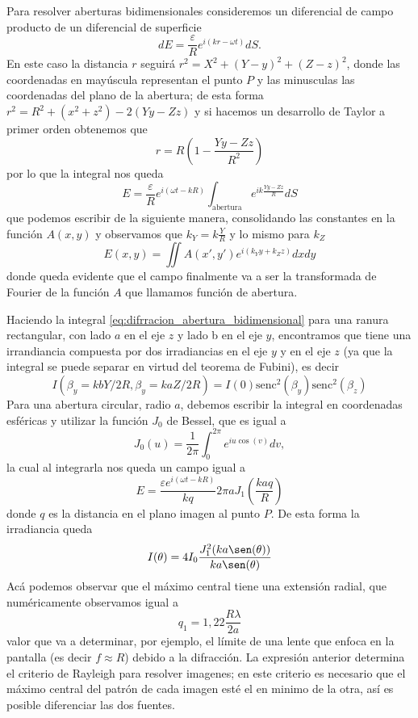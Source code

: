 \documentclass[a4paper]{article}
\numberwithin{equation}{section}
\begin{document}
	Para resolver aberturas bidimensionales consideremos un diferencial de campo producto de un diferencial de superficie \[ dE = \frac{\varepsilon}{R} e^{i (k r - \omega t)} dS.\] En este caso la distancia $r$ seguirá $r^2 = X^2 + (Y - y)^2 + (Z - z)^2$, donde las coordenadas en mayúscula representan el punto $P$ y las minusculas las coordenadas del plano de la abertura; de esta forma $r^2 = R^2 + (x^2 +z^2) - 2(Yy - Zz)$ y si hacemos un desarrollo de Taylor a primer orden obtenemos que \[r = R \left(1 - \frac{Yy - Zz}{R^2}\right)\] por lo que la integral nos queda
	\begin{equation}
		E = \frac{\varepsilon}{R} e^{i(\omega t - k R)} \int_{\text{abertura}} e^{i k \frac{Yy - Zz}{R}} dS
		\label{eq:difraccion_abertura_bidimensional}
	\end{equation}
	que podemos escribir de la siguiente manera, consolidando las constantes en la función $A(x,y)$ y observamos que $k_Y = k \frac{Y}{R}$ y lo mismo para $k_Z$
	\begin{equation}
		E(x,y) = \iint A(x',y') e^{i (k_Y y + k_Z z)} dx dy
		\label{eq:difraccion_general}
	\end{equation}
	donde queda evidente que el campo finalmente va a ser la transformada de Fourier de la función $A$ que llamamos función de abertura.
	
	Haciendo la integral \ref{eq:difrracion_abertura_bidimensional} para una ranura rectangular, con lado $a$ en el eje $z$ y lado b en el eje $y$, encontramos que tiene una irrandiancia compuesta por dos irradiancias en el eje $y$ y en el eje $z$ (ya que la integral se puede separar en virtud del teorema de Fubini), es decir
	\begin{equation}
		I(\beta_y = k b Y / 2 R, \beta_y = k a Z / 2 R) = I(0) \text{senc}^2(\beta_y) \text{senc}^2(\beta_z)
	\end{equation}
	Para una abertura circular, radio $a$, debemos escribir la integral en coordenadas esféricas y utilizar la función $J_0$ de Bessel, que es igual a \[J_0(u) = \frac{1}{2\pi} \int_0^{2\pi} e^{i u \cos(v)} dv,\] la cual al integrarla nos queda un campo igual a \[ E = \frac{\varepsilon e^{i(\omega t - k R)}}{k q} 2 \pi a J_1\left(\frac{k a q}{R}\right)\] donde $q$ es la distancia en el plano imagen al punto $P$. De esta forma la irradiancia queda 
	\begin{equation}
		I(\theta) = 4 I_0 \frac{J_1^2(k a \sen(\theta))}{k a \sen(\theta)}
		\label{eq:difraccion_circular_irradiancia}
	\end{equation}
	Acá podemos observar que el máximo central tiene una extensión radial, que numéricamente observamos igual a 
	\begin{equation}
		q_1 = 1,22\frac{R\lambda}{2 a}
	\end{equation}
	valor que va a determinar, por ejemplo, el límite de una lente que enfoca en la pantalla (es decir $f \approx R$) debido a la difracción. 
	La expresión anterior  determina el criterio de Rayleigh para resolver imagenes; en este criterio es necesario que el máximo central del patrón de cada imagen esté el en minimo de la otra, así es posible diferenciar las dos fuentes.
\end{document}
